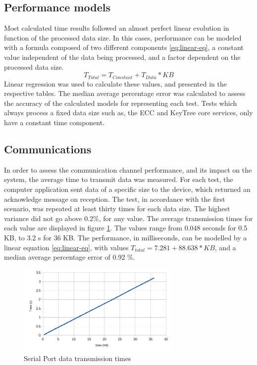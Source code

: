 \subsection{Performance models}\label{chap:evaluation:performance:models}

Most calculated time results followed an almost perfect linear evolution in function of the processed data size. In this cases, performance can be modeled with a formula composed of two different components \ref{eq:linear-eq}, a constant value independent of the data being processed, and a factor dependent on the processed data size.
\begin{equation}
	\label{eq:linear-eq}
	T_{Total} = T_{Constant} + T_{Data} * KB
\end{equation}
Linear regression was used to calculate these values, and presented in the respective tables. The median average percentage error was calculated to assess the accuracy of the calculated models for representing each test. Tests which always process a fixed data size such as, the \ac{ECC} and KeyTree core services, only have a constant time component.

\subsection{Communications}\label{chap:evaluation:performance:comms}

In order to assess the communication channel performance, and its impact on the system, the average time to transmit data was measured. For each test, the computer application sent data of a specific size to the device, which returned an acknowledge message on reception. The test, in accordance with the first scenario, was repeated at least thirty times for each data size. The highest variance did not go above 0.2\%, for any value.
The average transmission times for each value are displayed in figure \ref{fig:comms:time}.
The values range from 0.048 seconds for 0.5 KB, to 3.2 s for 36 KB.
The performance, in milliseconds, can be modelled by a linear equation \ref{eq:linear-eq}, with values \(T_{total} = 7.281 + 88.638 * KB\), and a median average percentage error of 0.92 \%.

\begin{figure}[h!]
	\centering
	\includegraphics[width=0.7\textwidth]{./Images/comms-time.png}
	\caption{Serial Port data transmission times}
	\label{fig:comms:time}
\end{figure}

